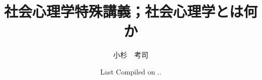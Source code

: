 \documentclass[a5]{ltjsbook}
\begin{document}

\VerbatimFootnotes
\title{社会心理学特殊講義；社会心理学とは何か}
\author{小杉　考司}
\date{Last Compiled on \number\year .\number\month .\number\day}
\maketitle
\setcounter{tocdepth}{1}



\tableofcontents













\printindex[nameidx]
\printindex[termidx]
\end{document}
